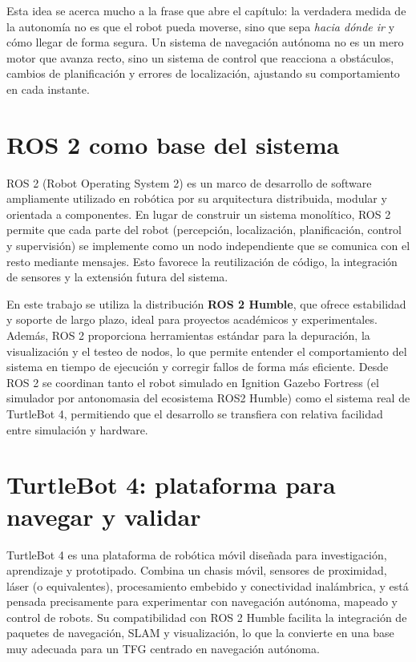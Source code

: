 Esta idea se acerca mucho a la frase que abre el capítulo: la verdadera medida de la autonomía no es que el robot pueda moverse, sino que sepa \emph{hacia dónde ir} y cómo llegar de forma segura. Un sistema de navegación autónoma no es un mero motor que avanza recto, sino un sistema de control que reacciona a obstáculos, cambios de planificación y errores de localización, ajustando su comportamiento en cada instante.

\section{ROS 2 como base del sistema}

ROS 2 (Robot Operating System 2) es un marco de desarrollo de software ampliamente utilizado en robótica por su arquitectura distribuida, modular y orientada a componentes. En lugar de construir un sistema monolítico, ROS 2 permite que cada parte del robot (percepción, localización, planificación, control y supervisión) se implemente como un nodo independiente que se comunica con el resto mediante mensajes. Esto favorece la reutilización de código, la integración de sensores y la extensión futura del sistema.

En este trabajo se utiliza la distribución \textbf{ROS 2 Humble}, que ofrece estabilidad y soporte de largo plazo, ideal para proyectos académicos y experimentales. Además, ROS 2 proporciona herramientas estándar para la depuración, la visualización y el testeo de nodos, lo que permite entender el comportamiento del sistema en tiempo de ejecución y corregir fallos de forma más eficiente. Desde ROS 2 se coordinan tanto el robot simulado en Ignition Gazebo Fortress (el simulador por antonomasia del ecosistema ROS2 Humble) como el sistema real de TurtleBot 4, permitiendo que el desarrollo se transfiera con relativa facilidad entre simulación y hardware.

\section{TurtleBot 4: plataforma para navegar y validar}

TurtleBot 4 es una plataforma de robótica móvil diseñada para investigación, aprendizaje y prototipado. Combina un chasis móvil, sensores de proximidad, láser (o equivalentes), procesamiento embebido y conectividad inalámbrica, y está pensada precisamente para experimentar con navegación autónoma, mapeado y control de robots. Su compatibilidad con ROS 2 Humble facilita la integración de paquetes de navegación, SLAM y visualización, lo que la convierte en una base muy adecuada para un TFG centrado en navegación autónoma.

